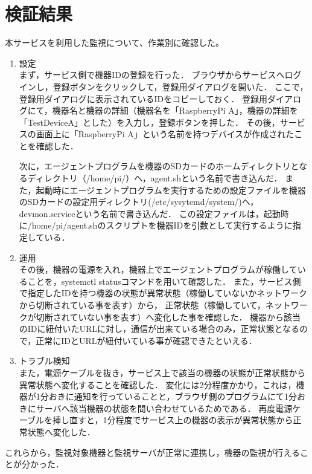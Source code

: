 \section{検証結果}
本サービスを利用した監視について、作業別に確認した。
\begin{enumerate}
\item 設定\\
まず，サービス側で機器IDの登録を行った．
ブラウザからサービスへログインし，登録ボタンをクリックして，登録用ダイアログを開いた．
ここで，登録用ダイアログに表示されているIDをコピーしておく．
登録用ダイアログにて，機器名と機器の詳細（機器名を「RaspberryPi A」，機器の詳細を「TestDeviceA」とした）を入力し，登録ボタンを押した．
その後，サービスの画面上に「RaspberryPi A」という名前を持つデバイスが作成されたことを確認した．

次に，エージェントプログラムを機器のSDカードのホームディレクトリとなるディレクトリ（/home/pi/）へ，agent.shという名前で書き込んだ．
また，起動時にエージェントプログラムを実行するための設定ファイルを機器のSDカードの設定用ディレクトリ(/etc/sysytemd/system/)へ，devmon.serviceという名前で書き込んだ．
この設定ファイルは，起動時に/home/pi/agent.shのスクリプトを機器IDを引数として実行するように指定している．

\item 運用\\
その後，機器の電源を入れ，機器上でエージェントプログラムが稼働していることを，systemctl statusコマンドを用いて確認した．
また，サービス側で指定したIDを持つ機器の状態が異常状態（稼働していないかネットワークから切断されている事を表す）から，
正常状態（稼働していて，ネットワークが切断されていない事を表す）へ変化した事を確認した．
機器から該当のIDに紐付いたURLに対し，通信が出来ている場合のみ，正常状態となるので，正常にIDとURLが紐付いている事が確認できたといえる．

\item トラブル検知\\
また，電源ケーブルを抜き，サービス上で該当の機器の状態が正常状態から異常状態へ変化することを確認した．
変化には2分程度かかり，これは，機器が1分おきに通知を行っていることと，ブラウザ側のプログラムにて1分おきにサーバへ該当機器の状態を問い合わせているためである．
再度電源ケーブルを挿し直すと，1分程度でサービス上の機器の表示が異常状態から正常状態へ変化した．
\end{enumerate}

これらから，監視対象機器と監視サーバが正常に連携し，機器の監視が行えることが分かった．







